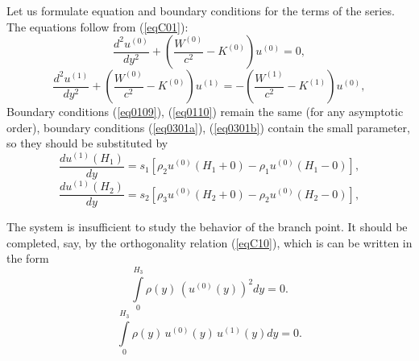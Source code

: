 \documentclass[12pt]{article}
\begin{document}
Let us formulate equation and boundary conditions for the terms of the series. 
The equations  follow from (\ref{eqC01}):
\begin{equation} 
\frac{d^2 u^{(0)}}{dy^2} + \left(\frac{W^{(0)}}{c^2} - K^{(0)}\right) u^{(0)} = 0 , 
\label{eqB05}
\end{equation}
\begin{equation} 
\frac{d^2 u^{(1)}}{dy^2} + \left(\frac{W^{(0)}}{c^2} - K^{(0)}\right) u^{(1)} = 
- \left(\frac{W^{(1)}}{c^2} - K^{(1)}\right) u^{(0)} , 
\label{eqB06}
\end{equation}
Boundary conditions (\ref{eq0109}), (\ref{eq0110}) remain the same (for any asymptotic order), boundary conditions 
(\ref{eq0301a}), (\ref{eq0301b}) contain the small parameter, so they should be
 substituted by 
\begin{equation}
\frac{d u^{(1)}(H_1)}{d y} = s_1 [\rho_2 u^{(0)} (H_1 + 0) - \rho_1 u^{(0)} (H_1-0)],
\label{eqB08}
\end{equation}
\begin{equation}
\frac{d u^{(1)}(H_2)}{d y} = s_2 [\rho_3 u^{(0)} (H_2 + 0) - \rho_2 u^{(0)} (H_2-0)],
\label{eqB09}
\end{equation}


The system is insufficient to study the behavior of the branch point. It should
be completed, say, by the orthogonality relation (\ref{eqC10}), which is can be written in the form 
\begin{equation}
\int \limits_0^{H_3} \rho(y)\, (u^{(0)}(y))^2 dy = 0. 
\label{eqB12}
\end{equation}
\begin{equation}
\int \limits_0^{H_3} \rho(y)\, u^{(0)}(y) \, u^{(1)}(y) dy = 0. 
\label{eqB13}
\end{equation}
\end{document}
